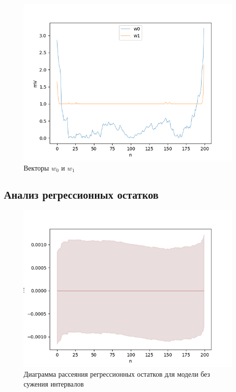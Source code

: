 \begin{figure}[ht]
	\begin{center}
		\includegraphics[scale = 0.55]{../images/w0_w1.png}
	\end{center}
	\caption{Векторы $w_0$ и $w_1$} \label{pic:w0_w1}
\end{figure}

\FloatBarrier
\subsection{Анализ регрессионных остатков}

\begin{figure}[ht]
	\begin{center}
		\includegraphics[scale = 0.55]{../images/analysis_of_regression_residuals_1.png}
	\end{center}
	\caption{Диаграмма рассеяния регрессионных остатков для модели без сужения интервалов} \label{pic:without_reduction}
\end{figure}

